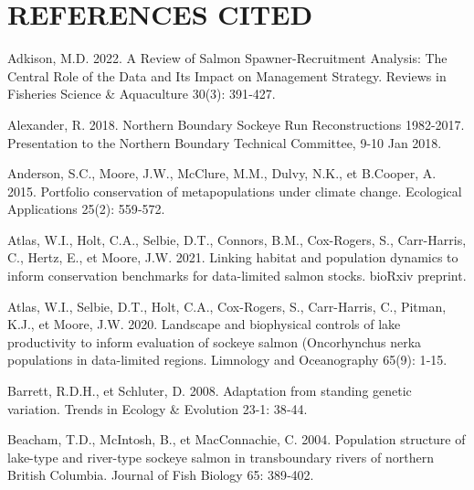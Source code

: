 \documentclass[french,11pt]{book}
\begin{document}
\section*{REFERENCES CITED}\label{references}
\noindent
\vspace{-2em}
\setlength{\parindent}{-0.2in}
\setlength{\leftskip}{0.2in}
\setlength{\parskip}{8pt}

\label{refs}
\begin{CSLReferences}{1}{0}
Adkison, M.D. 2022. A Review of Salmon Spawner-Recruitment Analysis: The Central Role of the Data and Its Impact on Management Strategy. Reviews in Fisheries Science \& Aquaculture 30(3): 391‑427.

Alexander, R. 2018. {Northern Boundary Sockeye Run Reconstructions 1982-2017}. Presentation to the Northern Boundary Technical Committee, 9-10 Jan 2018.

Anderson, S.C., Moore, J.W., McClure, M.M., Dulvy, N.K., et B.Cooper, A. 2015. {Portfolio conservation of metapopulations under climate change.} {Ecological Applications} 25(2): 559‑572.

Atlas, W.I., Holt, C.A., Selbie, D.T., Connors, B.M., Cox-Rogers, S., Carr-Harris, C., Hertz, E., et Moore, J.W. 2021. {Linking habitat and population dynamics to inform conservation benchmarks for data-limited salmon stocks}. bioRxiv preprint.

Atlas, W.I., Selbie, D.T., Holt, C.A., Cox-Rogers, S., Carr-Harris, C., Pitman, K.J., et Moore, J.W. 2020. {Landscape and biophysical controls of lake productivity to inform evaluation of sockeye salmon (Oncorhynchus nerka populations in data-limited regions}. Limnology and Oceanography 65(9): 1‑15.

Barrett, R.D.H., et Schluter, D. 2008. Adaptation from standing genetic variation. Trends in Ecology \& Evolution 23-1: 38‑44.

Beacham, T.D., McIntosh, B., et MacConnachie, C. 2004. {Population structure of lake-type and river-type sockeye salmon in transboundary rivers of northern British Columbia}. Journal of Fish Biology 65: 389‑402.


\end{CSLReferences}
\end{document}
